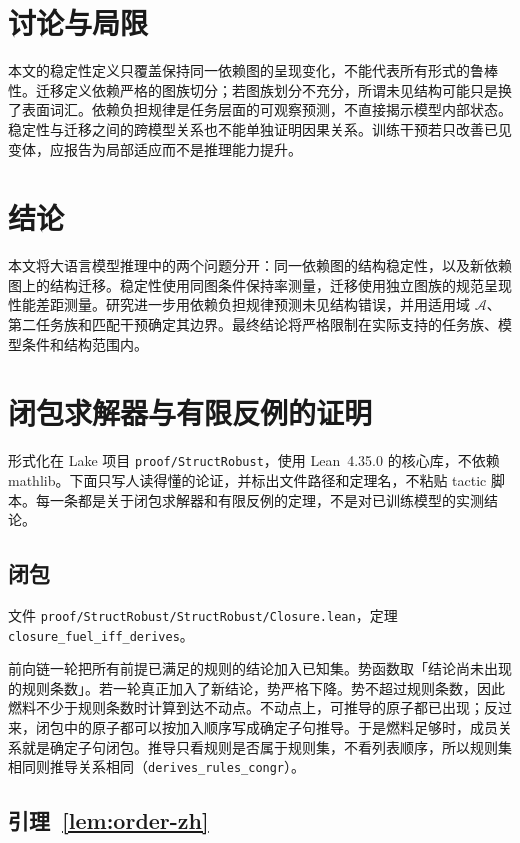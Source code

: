 \documentclass[UTF8,11pt,a4paper]{ctexart}
\theoremstyle{plain}
\begin{document}
\section{讨论与局限}

本文的稳定性定义只覆盖保持同一依赖图的呈现变化，不能代表所有形式的鲁棒性。迁移定义依赖严格的图族切分；若图族划分不充分，所谓未见结构可能只是换了表面词汇。依赖负担规律是任务层面的可观察预测，不直接揭示模型内部状态。稳定性与迁移之间的跨模型关系也不能单独证明因果关系。训练干预若只改善已见变体，应报告为局部适应而不是推理能力提升。

\section{结论}

本文将大语言模型推理中的两个问题分开：同一依赖图的结构稳定性，以及新依赖图上的结构迁移。稳定性使用同图条件保持率测量，迁移使用独立图族的规范呈现性能差距测量。研究进一步用依赖负担规律预测未见结构错误，并用适用域 $\mathcal A$、第二任务族和匹配干预确定其边界。最终结论将严格限制在实际支持的任务族、模型条件和结构范围内。

\appendix
\section{闭包求解器与有限反例的证明}
\label{app:proofs-zh}

形式化在 Lake 项目 \texttt{proof/StructRobust}，使用 Lean~4.35.0 的核心库，不依赖 mathlib。下面只写人读得懂的论证，并标出文件路径和定理名，不粘贴 tactic 脚本。每一条都是关于闭包求解器和有限反例的定理，不是对已训练模型的实测结论。

\subsection{闭包}
\label{app:closure-zh}

文件 \texttt{proof/StructRobust/StructRobust/Closure.lean}，定理 \texttt{closure\_fuel\_iff\_derives}。

前向链一轮把所有前提已满足的规则的结论加入已知集。势函数取「结论尚未出现的规则条数」。若一轮真正加入了新结论，势严格下降。势不超过规则条数，因此燃料不少于规则条数时计算到达不动点。不动点上，可推导的原子都已出现；反过来，闭包中的原子都可以按加入顺序写成确定子句推导。于是燃料足够时，成员关系就是确定子句闭包。推导只看规则是否属于规则集，不看列表顺序，所以规则集相同则推导关系相同（\texttt{derives\_rules\_congr}）。

\subsection{引理~\ref{lem:order-zh}}
\end{document}

